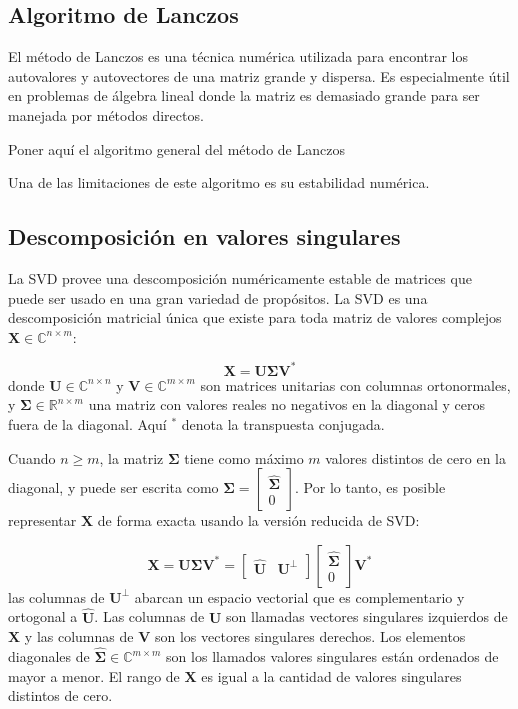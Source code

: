 \subsection*{Algoritmo de Lanczos}

El método de Lanczos es una técnica numérica utilizada para encontrar los autovalores y autovectores de una matriz grande y dispersa. Es especialmente útil en problemas de álgebra lineal donde la matriz es demasiado grande para ser manejada por métodos directos.

\alert{Poner aquí el algoritmo general del método de Lanczos}

Una de las limitaciones de este algoritmo es su estabilidad numérica.

\subsection*{Descomposición en valores singulares}

La SVD provee una descomposición numéricamente estable de matrices que puede ser usado en una gran variedad de propósitos. La SVD es una descomposición matricial única que existe para toda matriz de valores complejos $\mathbf{X} \in \mathbb{C}^{n \times m}$:

\begin{equation}
	\mathbf{X} = \mathbf{U} \mathbf{\Sigma} \mathbf{V}^*
\end{equation}
donde $\mathbf{U} \in \mathbb{C}^{n \times n}$ y $\mathbf{V} \in \mathbb{C}^{m \times m}$ son matrices unitarias con columnas ortonormales, y $\mathbf{\Sigma} \in \mathbb{R}^{n \times m}$ una matriz con valores reales no negativos en la diagonal y ceros fuera de la diagonal. Aquí $^*$ denota la transpuesta conjugada.

Cuando $n \ge m$, la matriz $\mathbf{\Sigma}$ tiene como máximo $m$ valores distintos de cero en la diagonal, y puede ser escrita como $\mathbf{\Sigma} = \begin{bmatrix}\hat{\mathbf{\Sigma}} \\ 0\end{bmatrix}$. Por lo tanto, es posible representar $\mathbf{X}$ de forma exacta usando la versión reducida de SVD:

\begin{equation}
	\mathbf{X} = \mathbf{U} \mathbf{\Sigma} \mathbf{V}^* = \begin{bmatrix} 	\hat{\mathbf{U}} & \mathbf{U}^\perp \end{bmatrix} \begin{bmatrix} \hat{\mathbf{\Sigma}} \\ 0 \end{bmatrix} \mathbf{V}^*
\end{equation}
las columnas de $\mathbf{U}^\perp$ abarcan un espacio vectorial que es complementario y ortogonal a $\hat{\mathbf{U}}$. Las columnas de $\mathbf{U}$ son llamadas vectores singulares izquierdos de $\mathbf{X}$ y las columnas de $\mathbf{V}$ son los vectores singulares derechos. Los elementos diagonales de $\hat{\mathbf{\Sigma}} \in \mathbb{C}^{m \times m}$ son los llamados valores singulares están ordenados de mayor a menor. El rango de $\mathbf{X}$ es igual a la cantidad de valores singulares distintos de cero.

